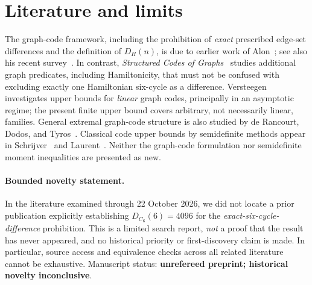 \documentclass[11pt,a4paper]{article}
\begin{document}
\section{Literature and limits}
The graph-code framework, including the prohibition of \emph{exact} prescribed edge-set differences and the definition of $D_H(n)$, is due to earlier work of Alon~\cite{alon}; see also his recent survey~\cite{alon_survey}. In contrast, \emph{Structured Codes of Graphs}~\cite{structured} studies additional graph predicates, including Hamiltonicity, that must not be confused with excluding exactly one Hamiltonian six-cycle as a difference. Versteegen~\cite{versteegen} investigates upper bounds for \emph{linear} graph codes, principally in an asymptotic regime; the present finite upper bound covers arbitrary, not necessarily linear, families. General extremal graph-code structure is also studied by de Rancourt, Dodos, and Tyros~\cite{uniformity}. Classical code upper bounds by semidefinite methods appear in Schrijver~\cite{schrijver} and Laurent~\cite{laurent}. Neither the graph-code formulation nor semidefinite moment inequalities are presented as new.\par
\paragraph{Bounded novelty statement.} In the literature examined through 22 October 2026, we did not locate a prior publication explicitly establishing $D_{C_6}(6)=4096$ for the \emph{exact-six-cycle-difference} prohibition. This is a limited search report, \emph{not} a proof that the result has never appeared, and no historical priority or first-discovery claim is made. In particular, source access and equivalence checks across all related literature cannot be exhaustive. Manuscript status: \textbf{unrefereed preprint; historical novelty inconclusive}.
\end{document}

